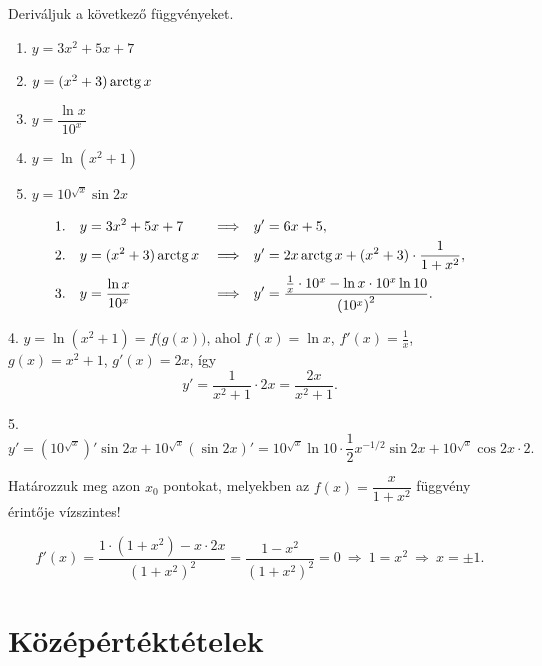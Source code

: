 \documentclass[11pt]{article}
\begin{document}
\begin{exbox}
\begin{example}
Deriváljuk a következő függvényeket.
\begin{enumerate}[label=\arabic*., itemsep=4pt]
\item $y=3x^{2}+5x+7$
\item $y=(x^{2}+3)\operatorname{arctg} x$
\item $y=\dfrac{\ln x}{10^{x}}$
\item $y=\ln(x^{2}+1)$
\item $y=10^{\sqrt{x}}\sin 2x$
\end{enumerate}
\end{example}
\end{exbox}
\begin{solution}
\begin{align*}
1.\quad y&=3x^{2}+5x+7 & &\Longrightarrow & y'&=6x+5,\\
2.\quad y&=(x^{2}+3)\operatorname{arctg} x & &\Longrightarrow & y'&=2x\operatorname{arctg} x+(x^{2}+3)\cdot\frac{1}{1+x^{2}},\\
3.\quad y&=\frac{\ln x}{10^{x}} & &\Longrightarrow & y'&=\frac{\frac{1}{x}\cdot 10^{x}-\ln x\cdot 10^{x}\ln 10}{\left(10^{x}\right)^{2}}.
\end{align*}

4. $y=\ln(x^{2}+1)=f\bigl(g(x)\bigr)$, ahol $f(x)=\ln x$, $f'(x)=\frac{1}{x}$, $g(x)=x^{2}+1$, $g'(x)=2x$, így
\[
y'=\frac{1}{x^{2}+1}\cdot 2x=\frac{2x}{x^{2}+1}.
\]

5.
\[
y'=\left(10^{\sqrt{x}}\right)'\sin 2x+10^{\sqrt{x}}(\sin 2x)'
=10^{\sqrt{x}}\ln 10\cdot\frac{1}{2}x^{-1/2}\sin 2x+10^{\sqrt{x}}\cos 2x\cdot 2 .
\]
\end{solution}

\begin{exbox}
\begin{example}
Határozzuk meg azon $x_{0}$ pontokat, melyekben az $f(x)=\dfrac{x}{1+x^{2}}$ függvény érintője vízszintes!
\end{example}
\end{exbox}
\begin{solution}
\[
f'(x)=\frac{1\cdot(1+x^{2})-x\cdot 2x}{(1+x^{2})^{2}}=\frac{1-x^{2}}{(1+x^{2})^{2}}=0
\ \Longrightarrow\ 1=x^{2}\ \Longrightarrow\ x=\pm 1 .
\]
\end{solution}

\section{Középértéktételek}
\end{document}

